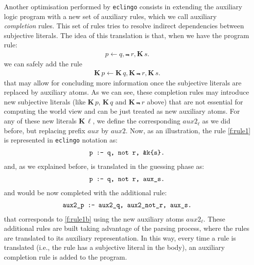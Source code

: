 \documentclass{new_tlp}
\def\K{\mathbf{K}\, }
\def\eclingo{{\tt eclingo}}
\def\bL{\K}
\begin{document}
Another optimisation performed by \eclingo{} consists in extending the auxiliary logic program with a new set of auxiliary rules,
which we call auxiliary \emph{completion} rules.
This set of rules tries to resolve indirect dependencies between subjective literals.
The idea of this translation is that, when we have the program rule:
\begin{eqnarray}
p \leftarrow q, \Not \ r, \K s.\label{f:rule1}
\end{eqnarray}
we can safely add the rule
\begin{eqnarray}
\K p \leftarrow \K q, \K \Not \ r, \K s. \label{f:rule1b}
\end{eqnarray}
that may allow for concluding more information once the subjective literals are replaced by auxiliary atoms.
%
As we can see, these completion rules may introduce new subjective literals (like $\bL p$, $\bL q$ and $\bL \Not\ r$ above) that are not essential for computing the world view and can be just treated as new auxiliary atoms.
%
For any of these new literals $\bL \ell$, we define the corresponding $\mathit{aux2}_\ell$ as we did before, but replacing prefix $\mathit{aux}$ by $\mathit{aux2}$.
%
Now, as an illustration, the rule \eqref{f:rule1} is represented in \eclingo{} notation as:
\begin{align*}
    \texttt{p\text{ \texttt{:-}} q,\ not\ r,\ \&k\{s\}.}
\end{align*}
and, as we explained before, is translated in the guessing phase as:
\begin{align*}
    \texttt{p\text{ \texttt{:-}} q,\ not\ r,\ aux\_s.}
\end{align*}
and would be now completed with the additional rule:
\begin{align*}
    \texttt{aux2\_p\text{ \texttt{:-}} aux2\_q,\ aux2\_not\_r,\ aux\_s.}
\end{align*}
that corresponds to \eqref{f:rule1b} using the new auxiliary atoms $\mathit{aux2}_\ell$.
%
These additional rules are built taking advantage of the parsing process, where the rules are translated to its auxiliary representation. In this way, every time
a rule is translated (i.e., the rule has a subjective literal in the body), an auxiliary completion rule is added to the program.
\end{document}
